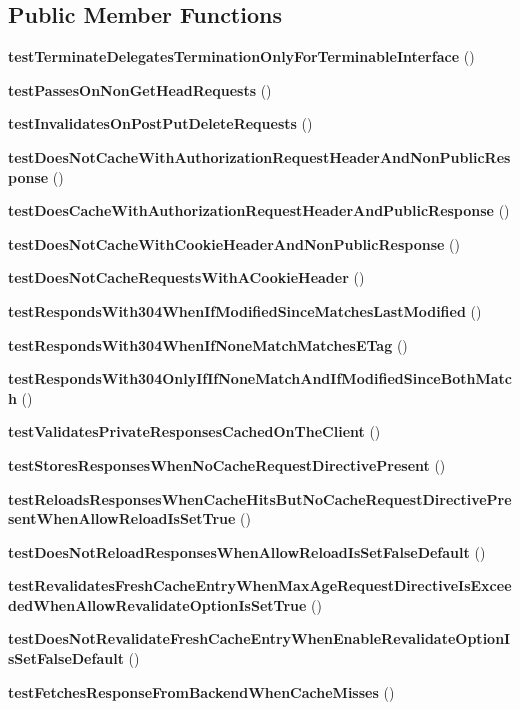 \subsection*{Public Member Functions}
\begin{DoxyCompactItemize}
\item 
{\bf test\+Terminate\+Delegates\+Termination\+Only\+For\+Terminable\+Interface} ()
\item 
{\bf test\+Passes\+On\+Non\+Get\+Head\+Requests} ()
\item 
{\bf test\+Invalidates\+On\+Post\+Put\+Delete\+Requests} ()
\item 
{\bf test\+Does\+Not\+Cache\+With\+Authorization\+Request\+Header\+And\+Non\+Public\+Response} ()
\item 
{\bf test\+Does\+Cache\+With\+Authorization\+Request\+Header\+And\+Public\+Response} ()
\item 
{\bf test\+Does\+Not\+Cache\+With\+Cookie\+Header\+And\+Non\+Public\+Response} ()
\item 
{\bf test\+Does\+Not\+Cache\+Requests\+With\+A\+Cookie\+Header} ()
\item 
{\bf test\+Responds\+With304\+When\+If\+Modified\+Since\+Matches\+Last\+Modified} ()
\item 
{\bf test\+Responds\+With304\+When\+If\+None\+Match\+Matches\+E\+Tag} ()
\item 
{\bf test\+Responds\+With304\+Only\+If\+If\+None\+Match\+And\+If\+Modified\+Since\+Both\+Match} ()
\item 
{\bf test\+Validates\+Private\+Responses\+Cached\+On\+The\+Client} ()
\item 
{\bf test\+Stores\+Responses\+When\+No\+Cache\+Request\+Directive\+Present} ()
\item 
{\bf test\+Reloads\+Responses\+When\+Cache\+Hits\+But\+No\+Cache\+Request\+Directive\+Present\+When\+Allow\+Reload\+Is\+Set\+True} ()
\item 
{\bf test\+Does\+Not\+Reload\+Responses\+When\+Allow\+Reload\+Is\+Set\+False\+Default} ()
\item 
{\bf test\+Revalidates\+Fresh\+Cache\+Entry\+When\+Max\+Age\+Request\+Directive\+Is\+Exceeded\+When\+Allow\+Revalidate\+Option\+Is\+Set\+True} ()
\item 
{\bf test\+Does\+Not\+Revalidate\+Fresh\+Cache\+Entry\+When\+Enable\+Revalidate\+Option\+Is\+Set\+False\+Default} ()
\item 
{\bf test\+Fetches\+Response\+From\+Backend\+When\+Cache\+Misses} ()
\item 

\end{DoxyCompactItemize}
